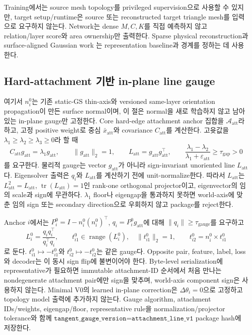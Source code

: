 \documentclass[11pt]{article}
\begin{document}
Training에서는 source mesh topology를 privileged supervision으로 사용할 수 있지만,
target setup/runtime은 source 또는 reconstructed target triangle mesh를 입력으로 요구하지 않는다.
Network는 dense \(M,C,K\)를 직접 예측하지 않고 relation/layer score와 area ownership만 출력한다.
Sparse physical reconstruction과 surface-aligned Gaussian work
\cite{jing2026bendtwin,guedon2024sugar,yu2024gof}는 representation baseline과 경계를 정하는 데 사용한다.

\subsection{Hard-attachment 기반 in-plane line gauge}

여기서 \(n_i^0\)는 기존 static-GS thin-axis와 versioned same-layer orientation propagation이 만든
surface normal이며, 이 절은 normal을 새로 학습하지 않고 남아 있는 in-plane gauge만 고정한다.
Core hard-edge attachment anchor 집합을 \(\mathcal A_{\mathrm{att}}\)라 하고, 고정 positive weight로
중심 \(\bar x_{\mathrm{att}}\)와 covariance \(C_{\mathrm{att}}\)를 계산한다. 고윳값을
\(\lambda_1\geq\lambda_2\geq\lambda_3\geq0\)라 할 때
\begin{equation}
  C_{\mathrm{att}}g_{\mathrm{att}}=\lambda_1g_{\mathrm{att}},\qquad
  \|g_{\mathrm{att}}\|_2=1,\qquad
  L_{\mathrm{att}}=g_{\mathrm{att}}g_{\mathrm{att}}^\top,\qquad
  \frac{\lambda_1-\lambda_2}{\lambda_1+\varepsilon_{\mathrm{att}}}
  \geq\tau_{\mathrm{gap}}>0
  \label{eq:minimal-attachment-line-gauge}
\end{equation}
를 요구한다. 물리적 gauge는 vector \(g_{\mathrm{att}}\)가 아니라 sign-invariant unoriented line
\(L_{\mathrm{att}}\)다. Eigensolver 출력은 \(q_i\)와 \(L_{\mathrm{att}}\)를 계산하기 전에
unit-normalize한다. 따라서 \(L_{\mathrm{att}}\)는
\(L_{\mathrm{att}}^2=L_{\mathrm{att}}\), \(\operatorname{tr}(L_{\mathrm{att}})=1\)인
rank-one orthogonal projector이고, eigenvector의 임의 scale과 sign에 무관하다.
\(\lambda_1\) floor나 eigengap을 통과하지 못하면 world-axis에 맞춘 임의 sign 또는
secondary direction으로 우회하지 않고 package를 reject한다.

Anchor \(i\)에서는 \(P_i^0=I-n_i^0(n_i^0)^\top\),
\(q_i=P_i^0g_{\mathrm{att}}\)에 대해 \(\|q_i\|\geq\tau_{\mathrm{gauge}}\)를 요구하고
\begin{equation}
  L_i^0=\frac{q_iq_i^\top}{q_i^\top q_i},\qquad
  t_{i1}^0\in\operatorname{range}(L_i^0),\quad \|t_{i1}^0\|_2=1,\qquad
  t_{i2}^0=n_i^0\times t_{i1}^0
  \label{eq:minimal-local-line-gauge}
\end{equation}
로 둔다. \(t_{i1}^0\mapsto-t_{i1}^0\)와 \(t_{i2}^0\mapsto-t_{i2}^0\)는 같은 gauge다.
Opposite pair, feature, label, loss와 decoder는 이 동시 sign flip에 불변이어야 한다.
Byte-level serialization에 representative가 필요하면 immutable attachment-ID 순서에서 처음 만나는
nondegenerate attachment pair에만 sign을 맞추며, world-axis component sign은 사용하지 않는다.
Minimal V0의 learned in-plane correction은 \(\Delta\theta_i=0\)으로 고정하고 topology model 출력에
추가하지 않는다. Gauge algorithm, attachment IDs/weights, eigengap/floor, representative rule을
normalization/projector tolerance와 함께
\(\texttt{tangent\_gauge\_version=attachment\_line\_v1}\) package hash에 저장한다.
\end{document}

